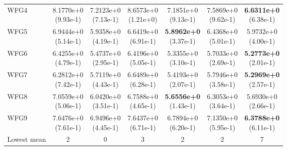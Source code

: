 \begin{table}[p]
\begin{tabular}{lcccccc}
WFG4 & \shortstack{8.1770e+0\\(9.93e-1)} & \shortstack{7.2123e+0\\(7.13e-1)} & \shortstack{8.6573e+0\\(1.21e+0)} & \shortstack{7.1851e+0\\(9.13e-1)} & \shortstack{7.5869e+0\\(9.62e-1)} & \shortstack{\textbf{6.6311e+0}\\(6.38e-1)} \\
WFG5 & \shortstack{6.9444e+0\\(5.14e-1)} & \shortstack{5.9358e+0\\(4.19e-1)} & \shortstack{6.6419e+0\\(6.91e-1)} & \shortstack{\textbf{5.8962e+0}\\(3.37e-1)} & \shortstack{6.4368e+0\\(5.01e-1)} & \shortstack{5.9732e+0\\(4.00e-1)} \\
WFG6 & \shortstack{6.4255e+0\\(4.79e-1)} & \shortstack{5.4737e+0\\(2.95e-1)} & \shortstack{6.4196e+0\\(5.05e-1)} & \shortstack{5.3355e+0\\(3.10e-1)} & \shortstack{5.7033e+0\\(2.69e-1)} & \shortstack{\textbf{5.2773e+0}\\(2.01e-1)} \\
WFG7 & \shortstack{6.2812e+0\\(7.42e-1)} & \shortstack{5.7119e+0\\(4.43e-1)} & \shortstack{6.6489e+0\\(6.28e-1)} & \shortstack{5.4193e+0\\(2.07e-1)} & \shortstack{5.7946e+0\\(3.58e-1)} & \shortstack{\textbf{5.2969e+0}\\(2.57e-1)} \\
WFG8 & \shortstack{7.0559e+0\\(5.06e-1)} & \shortstack{6.0420e+0\\(3.51e-1)} & \shortstack{6.7588e+0\\(4.65e-1)} & \shortstack{\textbf{5.6556e+0}\\(1.43e-1)} & \shortstack{6.3053e+0\\(3.64e-1)} & \shortstack{5.6930e+0\\(2.66e-1)} \\
WFG9 & \shortstack{7.6476e+0\\(7.61e-1)} & \shortstack{6.9496e+0\\(4.45e-1)} & \shortstack{7.6437e+0\\(6.71e-1)} & \shortstack{6.7894e+0\\(6.20e-1)} & \shortstack{7.1350e+0\\(5.95e-1)} & \shortstack{\textbf{6.3788e+0}\\(6.11e-1)} \\
\midrule
Lowest mean & 2 & 0 & 3 & 2 & 2 & 7 \\
\bottomrule
\end{tabular}
\end{table}
